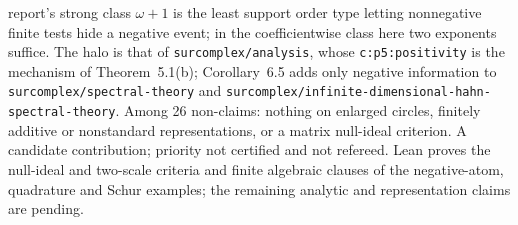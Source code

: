 \documentclass[11pt]{article}
\begin{document}
{report's strong class $\omega+1$ is the least support order type letting
nonnegative finite tests hide a negative event; in the coefficientwise class
here two exponents suffice.  The halo is that
of \nolinkurl{surcomplex/analysis}, whose \nolinkurl{c:p5:positivity} is the
mechanism of Theorem~5.1(b); Corollary~6.5 adds only negative information to
\nolinkurl{surcomplex/spectral-theory} and
\nolinkurl{surcomplex/infinite-dimensional-hahn-spectral-theory}.  Among 26
non-claims: nothing on enlarged circles, finitely additive or nonstandard
representations, or a matrix null-ideal criterion.  A candidate contribution;
priority not certified and not refereed. Lean proves the null-ideal and
two-scale criteria and finite algebraic clauses of the negative-atom,
quadrature and Schur examples; the remaining analytic and representation
claims are pending.}
\end{document}
